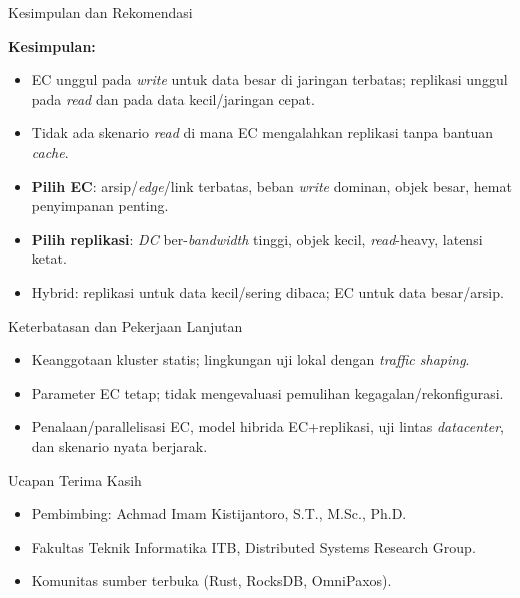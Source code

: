 \documentclass[a2,portrait]{config/poster/a0poster}
\newcommand{\postersection}[1]{%
	\begin{tcolorbox}[
		colback=MainBlue,
		colframe=MainBlue,
		fonttitle=\bfseries,
		coltext=white,
		sharp corners,
		boxrule=0pt,
		top=0pt,
		bottom=0pt,
		halign=center
	]
	\normalsize #1
	\end{tcolorbox}%
}
\begin{document}
\begin{multicols}{2}
\postersection{Kesimpulan dan Rekomendasi}
			\textbf{Kesimpulan:}
\begin{itemize}
	\item EC unggul pada \textit{write} untuk data besar di jaringan terbatas; replikasi unggul pada \textit{read} dan pada data kecil/jaringan cepat.
	\item Tidak ada skenario \textit{read} di mana EC mengalahkan replikasi tanpa bantuan \textit{cache}.
\end{itemize}
\begin{itemize}
	\item \textbf{Pilih EC}: arsip/\textit{edge}/link terbatas, beban \textit{write} dominan, objek besar, hemat penyimpanan penting.
	\item \textbf{Pilih replikasi}: \textit{DC} ber-\textit{bandwidth} tinggi, objek kecil, \textit{read}-heavy, latensi ketat.
	\item Hybrid: replikasi untuk data kecil/sering dibaca; EC untuk data besar/arsip.
\end{itemize}


\postersection{Keterbatasan dan Pekerjaan Lanjutan}
\begin{itemize}
	\item Keanggotaan kluster statis; lingkungan uji lokal dengan \textit{traffic shaping}.
	\item Parameter EC tetap; tidak mengevaluasi pemulihan kegagalan/rekonfigurasi.
\end{itemize}
\begin{itemize}
	\item Penalaan/parallelisasi EC, model hibrida EC+replikasi, uji lintas \textit{datacenter}, dan skenario nyata berjarak.
\end{itemize}


\postersection{Ucapan Terima Kasih}
\begin{itemize}
	\item Pembimbing: Achmad Imam Kistijantoro, S.T., M.Sc., Ph.D.
	\item Fakultas Teknik Informatika ITB, Distributed Systems Research Group.
	\item Komunitas sumber terbuka (Rust, RocksDB, OmniPaxos).
\end{itemize}


\end{multicols}
\end{document}
